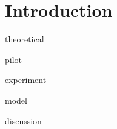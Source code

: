 \documentclass[../main.tex]{subfiles}
\begin{document}
\chapter{Introduction}
\label{cha:introduction}

 theoretical

 pilot

 experiment

 model

 discussion
\end{document}
